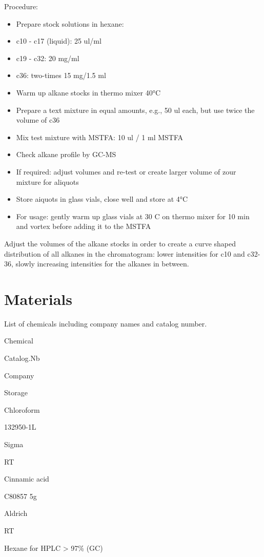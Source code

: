 \documentclass[]{book}
\providecommand{\tightlist}{%
  \setlength{\itemsep}{0pt}\setlength{\parskip}{0pt}}
\theoremstyle{definition}
\theoremstyle{definition}
\theoremstyle{definition}
\theoremstyle{remark}
\begin{document}
Procedure:

\begin{itemize}
\tightlist
\item
  Prepare stock solutions in hexane:
\item
  c10 - c17 (liquid): 25 ul/ml
\item
  c19 - c32: 20 mg/ml
\item
  c36: two-times 15 mg/1.5 ml
\item
  Warm up alkane stocks in thermo mixer 40°C
\item
  Prepare a text mixture in equal amounts, e.g., 50 ul each, but use
  twice the volume of c36
\item
  Mix test mixture with MSTFA: 10 ul / 1 ml MSTFA
\item
  Check alkane profile by GC-MS
\item
  If required: adjust volumes and re-test or create larger volume of
  zour mixture for aliquots
\item
  Store aiquots in glass vials, close well and store at 4°C
\item
  For usage: gently warm up glass vials at 30 C on thermo mixer for 10
  min and vortex before adding it to the MSTFA
\end{itemize}

Adjust the volumes of the alkane stocks in order to create a curve
shaped distribution of all alkanes in the chromatogram: lower
intensities for c10 and c32-36, slowly increasing intensities for the
alkanes in between.

\section{Materials}\label{materials}

\label{tab:chemicals}List of chemicals including company names and catalog
number.

Chemical

Catalog.Nb

Company

Storage

Chloroform

132950-1L

Sigma

RT

Cinnamic acid

C80857 5g

Aldrich

RT

Hexane for HPLC \textgreater{} 97\% (GC)
\end{document}
